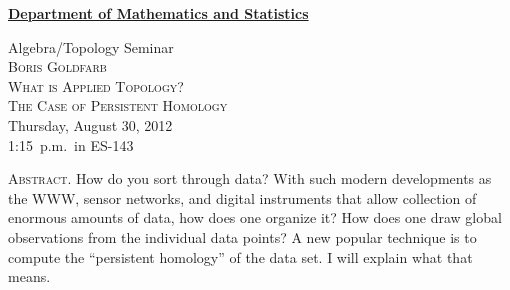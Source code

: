 \documentclass[12pt]{article}
\begin{document}
\noindent\hspace{-28pt}\raisebox{-19pt}{\XeTeXpicfile UAlogo.jpg scaled 340}%
\hfill\textsf{\textbf{\footnotesize\href{http://www.albany.edu/math/}{Department of Mathematics and Statistics}}}\bigskip\bigskip

\begin{center}\Large
  \textsf{\huge Algebra/Topology Seminar}\\[2.5\bigskipamount]
  \textsc{\LARGE Boris Goldfarb}\\[1.5\bigskipamount]
  \textsc{\LARGE What is Applied Topology?}\\
  \textsc{The Case of Persistent Homology}\\[2\bigskipamount]
  Thursday, August 30, 2012\\1:15~p.m.\ in ES-143\\[3\bigskipamount]
\end{center}

\noindent\large\textsc{Abstract.}
How do you sort through data?  With such modern developments as the WWW, sensor networks, and digital instruments that allow collection of enormous amounts of data, how does one organize it?  How does one draw global observations from the individual data points?  A new popular technique is to compute the ``persistent homology'' of the data set.  I will explain what that means.
\end{document}
